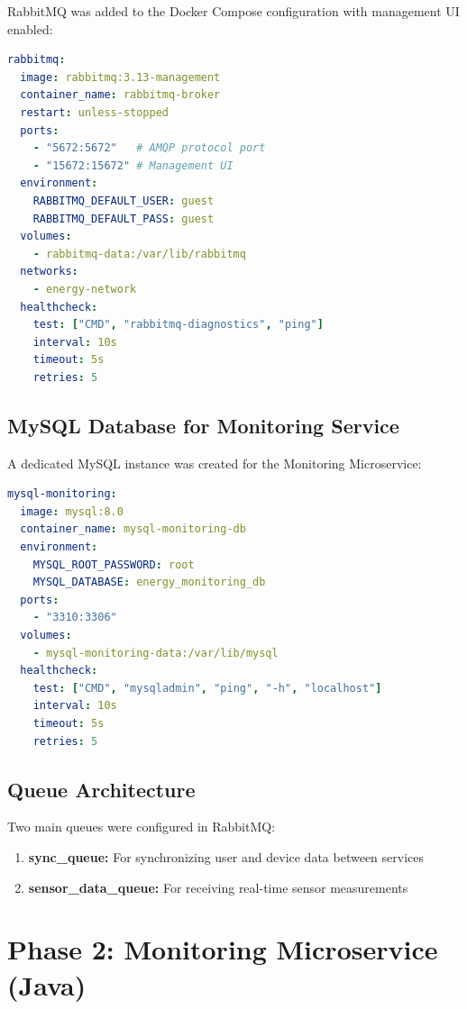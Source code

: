 \documentclass[12pt,a4paper]{article}
\begin{document}
RabbitMQ was added to the Docker Compose configuration with management UI enabled:

\begin{lstlisting}[language=yaml,caption=docker-compose.yml - RabbitMQ Service]
rabbitmq:
  image: rabbitmq:3.13-management
  container_name: rabbitmq-broker
  restart: unless-stopped
  ports:
    - "5672:5672"   # AMQP protocol port
    - "15672:15672" # Management UI
  environment:
    RABBITMQ_DEFAULT_USER: guest
    RABBITMQ_DEFAULT_PASS: guest
  volumes:
    - rabbitmq-data:/var/lib/rabbitmq
  networks:
    - energy-network
  healthcheck:
    test: ["CMD", "rabbitmq-diagnostics", "ping"]
    interval: 10s
    timeout: 5s
    retries: 5
\end{lstlisting}

\subsection{MySQL Database for Monitoring Service}

A dedicated MySQL instance was created for the Monitoring Microservice:

\begin{lstlisting}[language=yaml,caption=Monitoring Database Configuration]
mysql-monitoring:
  image: mysql:8.0
  container_name: mysql-monitoring-db
  environment:
    MYSQL_ROOT_PASSWORD: root
    MYSQL_DATABASE: energy_monitoring_db
  ports:
    - "3310:3306"
  volumes:
    - mysql-monitoring-data:/var/lib/mysql
  healthcheck:
    test: ["CMD", "mysqladmin", "ping", "-h", "localhost"]
    interval: 10s
    timeout: 5s
    retries: 5
\end{lstlisting}

\subsection{Queue Architecture}

Two main queues were configured in RabbitMQ:

\begin{enumerate}
    \item \textbf{sync\_queue:} For synchronizing user and device data between services
    \item \textbf{sensor\_data\_queue:} For receiving real-time sensor measurements
\end{enumerate}

\newpage


\section{Phase 2: Monitoring Microservice (Java)}
\end{document}
